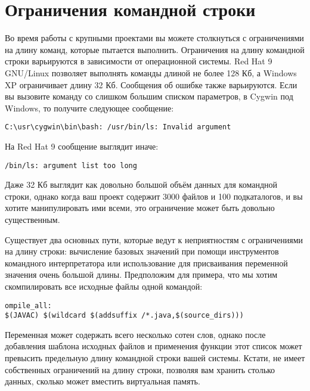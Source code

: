\section{Ограничения командной строки}
\label{sec:command_line_limits}

Во время работы с крупными проектами вы можете столкнуться с
ограничениями на длину команд, которые \GNUmake{} пытается выполнить.
Ограничения на длину командной строки варьируются в зависимости от
операционной системы. Red Hat 9 GNU/Linux позволяет выполнять команды
длиной не более 128 Кб, а Windows XP ограничивает длину 32 Кб.
Сообщения об ошибке также варьируются. Если вы вызовите команду
 со слишком большим списком параметров, в Cygwin под
Windows, то получите следующее сообщение:

{\footnotesize
\begin{verbatim}
C:\usr\cygwin\bin\bash: /usr/bin/ls: Invalid argument
\end{verbatim}
}

На Red Hat 9 сообщение выглядит иначе:

{\footnotesize
\begin{verbatim}
/bin/ls: argument list too long
\end{verbatim}
}

Даже 32 Кб выглядит как довольно большой объём данных для командной
строки, однако когда ваш проект содержит 3000 файлов и 100
подкаталогов, и вы хотите манипулировать ими всеми, это ограничение
может быть довольно существенным.

Существует два основных пути, которые ведут к неприятностям с
ограничениями на длину строки: вычисление базовых значений при помощи
инструментов командного интерпретатора или использование \GNUmake{}
для присваивания переменной значения очень большой длины. Предположим
для примера, что мы хотим скомпилировать все исходные файлы одной
командой:

{\footnotesize
\begin{verbatim}
ompile_all:
$(JAVAC) $(wildcard $(addsuffix /*.java,$(source_dirs)))
\end{verbatim}
}

Переменная \GNUmake{}  может содержать всего
несколько сотен слов, однако после добавления шаблона исходных файлов
\Java{} и применения функции  этот список может
превысить предельную длину командной строки вашей системы. Кстати,
\GNUmake{} не имеет собственных ограничений на длину строки, позволяя
вам хранить столько данных, сколько может вместить виртуальная память.

